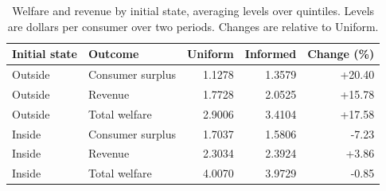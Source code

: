 \begin{table}[htbp]
\centering\small
\caption{Welfare and revenue by initial state, averaging levels over quintiles. Levels are dollars per consumer over two periods. Changes are relative to Uniform.}
\label{tab:theory-averages}
\begin{tabular}{llrrr}
\toprule
Initial state & Outcome & Uniform & Informed & Change (\%) \\
\midrule
Outside & Consumer surplus & 1.1278 & 1.3579 & +20.40 \\
Outside & Revenue & 1.7728 & 2.0525 & +15.78 \\
Outside & Total welfare & 2.9006 & 3.4104 & +17.58 \\
Inside & Consumer surplus & 1.7037 & 1.5806 & -7.23 \\
Inside & Revenue & 2.3034 & 2.3924 & +3.86 \\
Inside & Total welfare & 4.0070 & 3.9729 & -0.85 \\
\bottomrule
\end{tabular}
\end{table}
